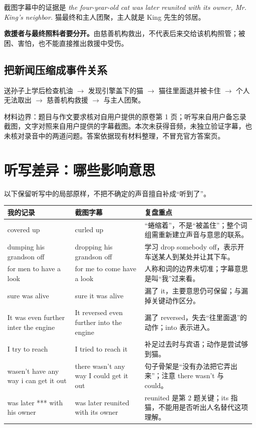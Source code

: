 \documentclass[UTF8,a4paper,11pt,fontset=fandol]{ctexart}
\newcommand{\en}[1]{\textit{#1}}
\begin{document}
截图字幕中的证据是 \en{the four-year-old cat was later reunited with its owner, Mr. King's neighbor.} 猫最终和主人团聚，主人就是 King 先生的邻居。

\textbf{救援者与最终照料者要分开。}由慈善机构救出，不代表后来交给该机构照管；被困、害怕，也不能直接推出救援中受伤。

\subsection{把新闻压缩成事件关系}
送孙子上学后检查机油 $\rightarrow$ 发现引擎盖下的猫 $\rightarrow$ 猫往里面退并被卡住 $\rightarrow$ 个人无法取出 $\rightarrow$ 慈善机构救援 $\rightarrow$ 与主人团聚。

{\small\color{gray}材料边界：题目与作文要求核对自用户提供的原卷第 1 页；听写来自用户备忘录截图，文字对照来自用户提供的字幕截图。本次未获得音频，未独立验证字幕，也未核对录音中的两道问题。答案依据现有材料整理，不冒充官方答案页。}

\newpage
\section{听写差异：哪些影响意思}
以下保留听写中的局部原样，不把不确定的声音擅自补成“听到了”。

\renewcommand{\arraystretch}{1.3}
\begin{tabularx}{\textwidth}{@{}>{\raggedright\arraybackslash}p{}>{\raggedright\arraybackslash}p{}X@{}}
\toprule
我的记录 & 截图字幕 & 复盘重点\\
\midrule
covered up & curled up & “蜷缩着”，不是“被盖住”；整个词组需重新建立声音与意思的联系。\\
dumping his grandson off & dropping his grandson off & 学习 drop somebody off，表示开车送某人到某处并让其下车。\\
for men to have a look & for me to come have a look & 人称和词的边界未切准；字幕意思是叫“我”过来看。\\
sure was alive & sure it was alive & 漏了 it，主要意思仍可保留；与漏掉关键动作区分。\\
It was even further inter the engine & It reversed even further into the engine & 漏了 reversed，失去“往里面退”的动作；into 表示进入。\\
I try to reach & I tried to reach it & 补足过去时与宾语；动作是尝试够到猫。\\
wasen't have any way i can get it out & there wasn't any way I could get it out & 句子骨架是“没有办法把它弄出来”；注意 there wasn't 与 could。\\
was later *** with his owner & was later reunited with its owner & reunited 是第 2 题关键；its 指猫，不能用是否听出人名替代这项理解。\\
\bottomrule
\end{tabularx}
\end{document}
